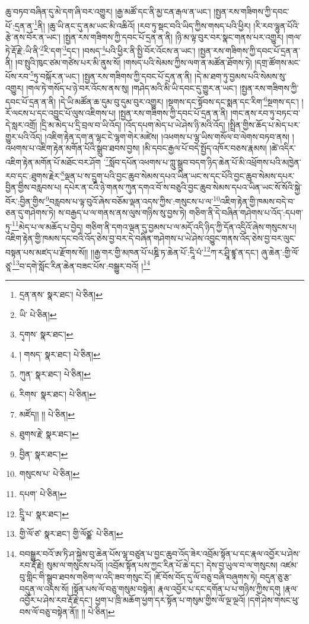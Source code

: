 ཆུ་བཏབ་བཞིན་དུ་མེ་དག་ཞི་བར་འགྱུར། །རྒྱ་མཚོ་དང་ནི་མྱ་ངན་རྒལ་ན་ཡང་། །སྤྱན་རས་གཟིགས་ཀྱི་དབང་པོ་:དྲན་ན་\footnote{དྲན་ནས་  སྣར་ཐང་།  པེ་ཅིན། }ནི། །ཆུ་ཡི་ནང་དུ་ནམ་ཡང་མི་འཆིའོ། །རབ་ཏུ་སྡང་བའི་ཡིད་ཀྱིས་གསད་པའི་ཕྱིར། །རི་རབ་ལྷུན་པོའི་རྩེ་ནས་བོར་ན་ཡང་། །སྤྱན་རས་གཟིགས་ཀྱི་དབང་པོ་དྲན་ན་ནི། །ཉི་མ་ལྟ་བུར་བར་སྣང་གནས་པར་འགྱུར། །གལ་ཏེ་རྡོ་རྗེ་:ཡི་ནི་\footnote{ཡི་  པེ་ཅིན། }རི་དག་\footnote{དྭགས་  སྣར་ཐང་། }དང་། །བསད་\footnote{། གསད་  སྣར་ཐང་།  པེ་ཅིན། }པའི་ཕྱིར་ནི་སྤྱི་བོར་འོངས་ན་ཡང་། །སྤྱན་རས་གཟིགས་ཀྱི་དབང་པོ་དྲན་ན་ནི། །བ་སྤུའི་ཁུང་ཙམ་གཙེས་པར་མི་ནུས་སོ། །གསད་པའི་སེམས་ཀྱིས་ལག་ན་མཚོན་ཐོགས་ཏེ། །དགྲ་ཚོགས་མང་པོས་རབ་\footnote{ཀུན་  སྣར་ཐང་།  པེ་ཅིན། }ཏུ་བསྐོར་ན་ཡང་། །སྤྱན་རས་གཟིགས་ཀྱི་དབང་པོ་དྲན་ན་ནི། །དེ་མ་ཐག་ཏུ་བྱམས་པའི་སེམས་སུ་འགྱུར། །གལ་ཏེ་གསོད་པ་ཉེ་བར་འོངས་ནས་སུ། །གཤེད་མའི་མི་ཡི་དབང་དུ་གྱུར་ན་ཡང་། །སྤྱན་རས་གཟིགས་ཀྱི་དབང་པོ་དྲན་ན་ནི། །དེ་ཡི་མཚོན་ཆ་དུམ་བུ་དུམ་བུར་འགྱུར། །སྔགས་དང་སྟོབས་དང་སྨན་དང་རིག་\footnote{རིགས་  སྣར་ཐང་།  པེ་ཅིན། }སྔགས་དང་། །རོ་ལངས་པ་དང་འབྱུང་པོ་ལུས་འཇིགས་པ། །སྤྱན་རས་གཟིགས་ཀྱི་དབང་པོ་དྲན་ན་ནི། །གང་ནས་རབ་ཏུ་བཏང་བ་དེ་སླར་འགྲོ། །དྲི་མ་མེད་པ་དྲི་བྲལ་བ་ཡི་འོད། །འོད་དཔག་མེད་པ་ཡེ་ཤེས་ཉི་མའི་འོད། །སྤྲིན་གྱིས་ཆོད་པ་མེད་པར་གྱུར་པའི་འོད། །འཇིག་རྟེན་དག་ན་ལྷང་ངེ་ལྷག་གེར་མཛེས། །འཕགས་པ་ལྷ་ཡིས་གསོལ་བ་ལེགས་བཏབ་ནས། །འཕགས་པ་འཇིག་རྟེན་མགོན་པོའི་སྒྲུབ་ཐབས་བྱས། །མི་དབང་རྒྱལ་པོ་བདེ་སྤྱོད་འཁོར་བཅས་རྣམས། །ཚེ་འདིར་འཇིག་རྟེན་མགོན་པོ་མཐོང་བར་ཤོག ་\footnote{མཛོད།། །།  པེ་ཅིན། }སློབ་དཔོན་འཕགས་པ་ཀླུ་སྒྲུབ་བདག་ཉིད་ཆེན་པོ་མི་འཕྲོགས་པའི་མཁྱེན་རབ་དང་:ཐུགས་རྗེར་\footnote{ཐུགས་རྗེ་  སྣར་ཐང་། }ལྡན་པ་ས་དྲུག་པའི་བྱང་ཆུབ་སེམས་དཔའ་ཡིན་ཡང་ས་དང་པོའི་བྱང་ཆུབ་སེམས་དཔར་བྱིན་གྱིས་བརླབས་པ། དཔེར་ན་ངའི་ཉེ་གནས་ཀུན་དགའ་བོ་ས་བཅུའི་བྱང་ཆུབ་སེམས་དཔའ་ཡིན་ཡང་སོ་སོའི་སྐྱེ་བོར་:བྱིན་གྱིས་\footnote{བྱིན་  སྣར་ཐང་། }བརླབས་པ་ལྟ་བུའོ་ཞེས་བཅོམ་ལྡན་འདས་ཀྱིས་:གསུངས་པ་ལ་\footnote{གསུངས་པ་  པེ་ཅིན། }འཇིག་རྟེན་གྱི་ཁམས་བདེ་བ་ཅན་དུ་གཤེགས་ཏེ། ས་བརྒྱད་པ་ལ་གནས་ནས་ལུས་གཉིས་སུ་བྱས་ཏེ། གཅིག་ནི་དེ་བཞིན་གཤེགས་པ་འོད་:དཔག་ཏུ་\footnote{དཔག་  པེ་ཅིན། }མེད་པ་ལ་མཆོད་པ་བྱེད། གཅིག་ནི་དགའ་ལྡན་དུ་བྱམས་པ་ལ་མདོ་འདི་ཉིད་ཀྱི་དོན་འདྲིའོ་ཞེས་གསུངས་པ། འཇིག་རྟེན་གྱི་ཁམས་དང་བའི་འོད་ཅེས་བྱ་བར་དེ་བཞིན་གཤེགས་པ་ཡེ་ཤེས་འབྱུང་གནས་འོད་ཅེས་བྱ་བར་ལུང་བསྟན་པས་མཛད་པ་རྫོགས་སོ།། །།རྒྱ་གར་གྱི་མཁན་པོ་པཎྜི་ཏ་ཆེན་པོ་:དཱི་པཾ་\footnote{དྲཱི་པ་  སྣར་ཐང་། }ཀ་ར་ཤྲཱི་ཛྙཱ་ན་དང་། ཞུ་ཆེན་:གྱི་ལོ་ཙཱ་\footnote{གྱི་ལོ་ཙ་  སྣར་ཐང་། གྱི་ལོཙྪ་  པེ་ཅིན། }བ་དགེ་སློང་རིན་ཆེན་བཟང་པོས་:བསྒྱུར་བའོ། །\footnote{བབསྒྱུར་བའོ་ཨ་ཏི་ཤ་སྐྱེས་བུ་ཆེན་པོས་ལྷ་བཙུན་པ་བྱང་ཆུབ་འོད་ཟེར་འབྲོམ་སྟོན་པ་དང་རྣལ་འབྱོར་པ་ཤེས་རབ་རྡོ་རྗེ། སུམ་ལ་གསུངས་པའོ། །འབྲོམ་སྟོན་པས་ཀྱང་རིན་པོ་ཆེ་དང་། དེས་བྱ་ཡུལ་བ་ལ་གསུངས། འཛམ་བུ་གླིང་གི་སྒྲུབ་ཐབས་གཅིག་ལ་འདི་ཟབ་གསུང་ངོ། །ཇོ་བོས་བོད་དུ་ལོ་བཅུ་བཞི་བཞུགས་ཏེ། བདུན་ཅུ་རྩ་བདུན་ལ་འདས་སོ། །སྟོན་པས་ལོ་བཅུ་གསུམ་བསྟེན། རྣལ་འབྱོར་པ་དང་དགོན་པ་པ་གཉིས་ཀྱིས་དགུ །རྣལ་འབྱོར་པ་ཤེས་རབ་རྡོ་རྗེ་དང་། ཕྱག་པ་ཁྲི་མཆོག་ཕྱག་དར་སྟོན་པ་གསུམ་གྱིས་ལོ་ལྔ་ལྔའོ། །དགེ་ཤེས་གསང་ཕུ་བས་ལོ་བཅུ་བསྟེན་ནོ།། །།  པེ་ཅིན། }